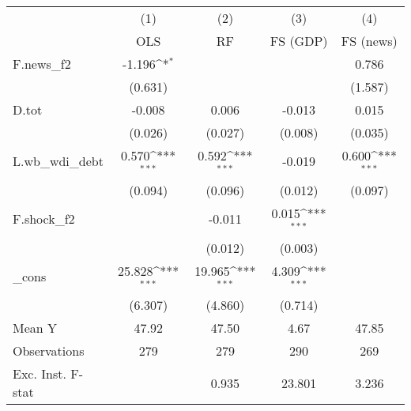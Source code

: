 {
\def\sym#1{\ifmmode^{#1}\else\(^{#1}\)\fi}
\begin{tabular}{l*{4}{c}}
\toprule
            &\multicolumn{1}{c}{(1)}&\multicolumn{1}{c}{(2)}&\multicolumn{1}{c}{(3)}&\multicolumn{1}{c}{(4)}\\
            &\multicolumn{1}{c}{OLS}&\multicolumn{1}{c}{RF}&\multicolumn{1}{c}{FS (GDP)}&\multicolumn{1}{c}{FS (news)}\\
\midrule
F.news\_f2   &      -1.196\sym{*}  &                     &                     &       0.786         \\
            &     (0.631)         &                     &                     &     (1.587)         \\
\addlinespace
D.tot       &      -0.008         &       0.006         &      -0.013         &       0.015         \\
            &     (0.026)         &     (0.027)         &     (0.008)         &     (0.035)         \\
\addlinespace
L.wb\_wdi\_debt&       0.570\sym{***}&       0.592\sym{***}&      -0.019         &       0.600\sym{***}\\
            &     (0.094)         &     (0.096)         &     (0.012)         &     (0.097)         \\
\addlinespace
F.shock\_f2  &                     &      -0.011         &       0.015\sym{***}&                     \\
            &                     &     (0.012)         &     (0.003)         &                     \\
\addlinespace
\_cons      &      25.828\sym{***}&      19.965\sym{***}&       4.309\sym{***}&                     \\
            &     (6.307)         &     (4.860)         &     (0.714)         &                     \\
\midrule
Mean Y      &       47.92         &       47.50         &        4.67         &       47.85         \\
Observations&         279         &         279         &         290         &         269         \\
Exc. Inst. F-stat&                     &       0.935         &      23.801         &       3.236         \\
\bottomrule
\end{tabular}
}
